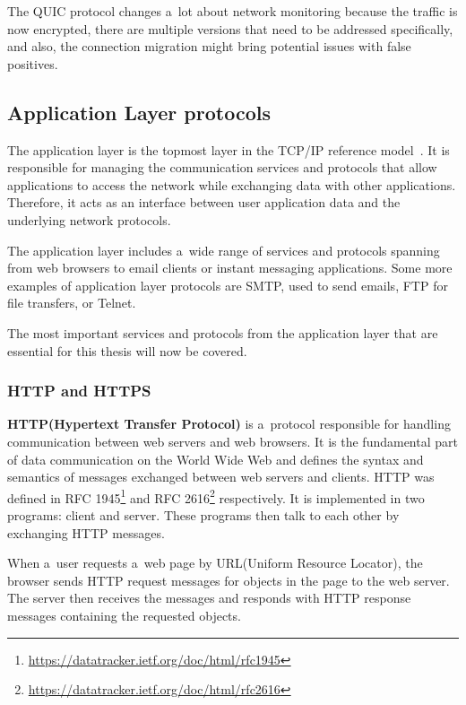 \documentclass[
  printed,     %
  color,       %
  oneside,     %
  nosansbold,  %
  nocolorbold, %
  nolof,         %
  nolot,         %
]{fithesis4}
\begin{document}
\medskip

The QUIC protocol changes a~lot about network monitoring because the traffic is now encrypted, there are multiple versions that need to be addressed specifically, and also, the connection migration might bring potential issues with false positives.

\subsection{Application Layer protocols}

The application layer is the topmost layer in the TCP/IP reference model~\cite{10.5555/2584507}. It is responsible for managing the communication services and protocols that allow applications to access the network while exchanging data with other applications. Therefore, it acts as an interface between user application data and the underlying network protocols.

The application layer includes a~wide range of services and protocols spanning from web browsers to email clients or instant messaging applications. Some more examples of application layer protocols are SMTP, used to send emails, FTP for file transfers, or Telnet.

The most important services and protocols from the application layer that are essential for this thesis will now be covered.

\subsubsection{HTTP and HTTPS}

\textbf{HTTP(Hypertext Transfer Protocol)} is a~protocol responsible for handling communication between web servers and web browsers. It is the fundamental part of data communication on the World Wide Web and defines the syntax and semantics of messages exchanged between web servers and clients. HTTP was defined in RFC 1945\footnote{\url{https://datatracker.ietf.org/doc/html/rfc1945}} and RFC 2616\footnote{\url{https://datatracker.ietf.org/doc/html/rfc2616}} respectively. It is implemented in two programs: client and server. These programs then talk to each other by exchanging HTTP messages.

\medskip

When a~user requests a~web page by URL(Uniform Resource Locator), the browser sends HTTP request messages for objects in the page to the web server. The server then receives the messages and responds with HTTP response messages containing the requested objects.
\end{document}
